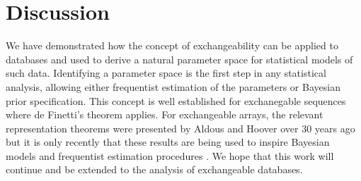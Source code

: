 \section{Discussion}

We have demonstrated how the concept of exchangeability can be applied to databases and used to derive a natural parameter space for statistical models of such data.
Identifying a parameter space is the first step in any statistical analysis, allowing either frequentist estimation of the parameters or Bayesian prior specification.
This concept is well established for exchanegable sequences where de Finetti's theorem \citep[e.g.][]{Kallenberg2005} applies.
For exchangeable arrays, the relevant representation theorems were presented by Aldous and Hoover \cite{Aldous1981a, Hoover1979} over 30 years ago but it is only recently that these results are being used to inspire Bayesian models \cite{Hoff2007a, Roy2009, Lloyd2012} and frequentist estimation procedures \cite{Kallenberg1999a,Choi2012, Wolfe2013}.
We hope that this work will continue and be extended to the analysis of exchangeable databases.

\outbpdocument{


}
